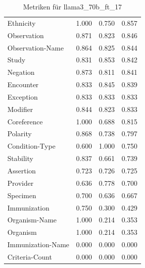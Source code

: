 \begin{table}[htbp]
\begin{tabular}{p{5cm}ccc}
Ethnicity & 1.000 & 0.750 & 0.857 \\
Observation & 0.871 & 0.823 & 0.846 \\
Observation-Name & 0.864 & 0.825 & 0.844 \\
Study & 0.831 & 0.853 & 0.842 \\
Negation & 0.873 & 0.811 & 0.841 \\
Encounter & 0.833 & 0.845 & 0.839 \\
Exception & 0.833 & 0.833 & 0.833 \\
Modifier & 0.844 & 0.823 & 0.833 \\
Coreference & 1.000 & 0.688 & 0.815 \\
Polarity & 0.868 & 0.738 & 0.797 \\
Condition-Type & 0.600 & 1.000 & 0.750 \\
Stability & 0.837 & 0.661 & 0.739 \\
Assertion & 0.723 & 0.726 & 0.725 \\
Provider & 0.636 & 0.778 & 0.700 \\
Specimen & 0.700 & 0.636 & 0.667 \\
Immunization & 0.750 & 0.300 & 0.429 \\
Organism-Name & 1.000 & 0.214 & 0.353 \\
Organism & 1.000 & 0.214 & 0.353 \\
Immunization-Name & 0.000 & 0.000 & 0.000 \\
Criteria-Count & 0.000 & 0.000 & 0.000 \\
\bottomrule
\end{tabular}
\caption{Metriken für llama3_70b_ft_17}
\label{tab:metrics_llama3_70b_ft_17}
\end{table}